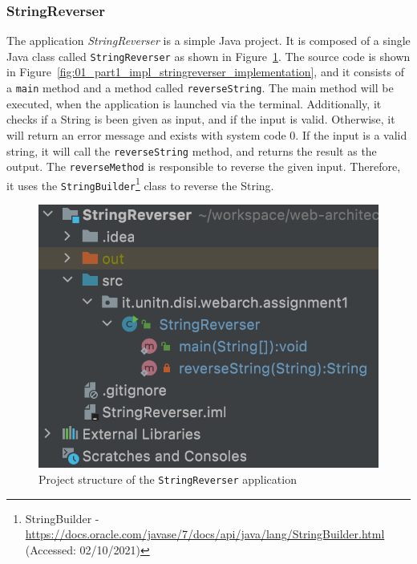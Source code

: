 \documentclass{article}
\def\Fig#1{Figure~\ref{#1}}
\begin{document}
\subsubsection{StringReverser}
The application \textit{StringReverser} is a simple Java project. It is composed of a single Java class called \texttt{StringReverser} as shown in \Fig{fig:01_part1_impl_stringreverser_structure}.
The source code is shown in \Fig{fig:01_part1_impl_stringreverser_implementation}, and it consists of a \texttt{main} method and a method called \texttt{reverseString}.
The main method will be executed, when the application is launched via the terminal. Additionally, it checks if a String is been given as input, and if the input is valid. Otherwise, it will return an error message and exists with system code 0. If the input is a valid string, it will call the \texttt{reverseString} method, and returns the result as the output.
The \texttt{reverseMethod} is responsible to reverse the given input. Therefore, it uses the \texttt{StringBuilder}\footnote{StringBuilder - \url{https://docs.oracle.com/javase/7/docs/api/java/lang/StringBuilder.html} (Accessed: 02/10/2021)} class to reverse the String.

\begin{figure}[h]
\centering
\includegraphics[scale=0.4]{images/StringReverserStrct}
\caption{Project structure of the \texttt{StringReverser} application}
\label{fig:01_part1_impl_stringreverser_structure}
\end{figure}
\end{document}
